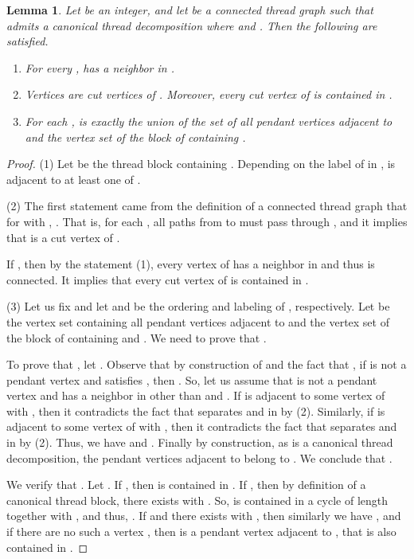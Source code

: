 \documentclass[11pt]{article}
\newtheorem{lemma}[theorem]{Lemma}
\theoremstyle{remark}
\begin{document}
\begin{lemma}\label{lem:structure}
Let  be an integer, and let  be a connected thread graph such that
 admits a canonical thread decomposition  where 
 and
.
Then the following are satisfied.
\begin{enumerate}[(1)]
\item For every ,  has a neighbor in . 
\item Vertices  are cut vertices of .
Moreover, every cut vertex of  is contained in .
\item For each ,  is exactly the union of the set of all pendant vertices adjacent to  and the vertex set of the block of  containing .
\end{enumerate}
\end{lemma}
\begin{proof}
(1) Let  be the thread block containing . Depending on the label of  in , 
 is adjacent to at least one of .

\medskip
\noindent
(2) The first statement came from the definition of a connected thread graph that 
for  with , . 
That is, for each , all paths from  to  must pass through , and it implies that  is a cut vertex of .


If , 
then by the statement (1), every vertex of  has a neighbor in  and thus  is connected.
It implies that every cut vertex of  is contained in .

\medskip
\noindent
(3) Let us fix  and let  and  be the ordering and labeling of , respectively.
Let  be the vertex set containing all pendant vertices adjacent to  and the vertex set of the block of  containing  and .
We need to prove that .

To prove that , let . 
Observe that by construction of  and the fact that , if  is not a pendant vertex and satisfies , then . 
So, let us assume that  is not a pendant vertex and has a neighbor in  other than  and .
If  is adjacent to some vertex  of  with , then  it contradicts the fact that  separates  and  in  by (2).
Similarly, if  is adjacent to some vertex  of  with , then it contradicts the fact that  separates  and  in  by (2).
Thus, we have  and .
Finally by construction, as  is a canonical thread decomposition, the pendant vertices adjacent to  belong to . We conclude that .





We verify that . Let .
If , then  is contained in .
If , then by definition of a canonical thread block, there exists  with .
So,  is contained in a cycle of length  together with , and thus, .
If  and there exists  with , 
then similarly we have , 
and if there are no such a vertex , then  is a pendant vertex adjacent to , that is also contained in .
\end{proof}
\end{document}
